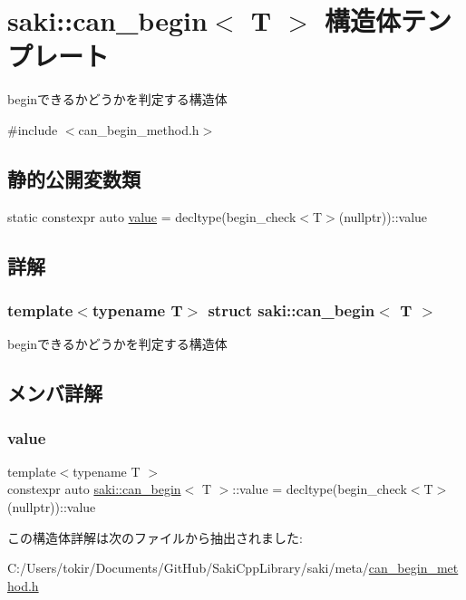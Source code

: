 \hypertarget{structsaki_1_1can__begin}{}\section{saki\+:\+:can\+\_\+begin$<$ T $>$ 構造体テンプレート}
\label{structsaki_1_1can__begin}


beginできるかどうかを判定する構造体  




{\ttfamily \#include $<$can\+\_\+begin\+\_\+method.\+h$>$}

\subsection*{静的公開変数類}
\begin{DoxyCompactItemize}
\item 
static constexpr auto \mbox{\hyperlink{structsaki_1_1can__begin_a6d16b8cbacbf7d9be197d09c517d503d}{value}} = decltype(begin\+\_\+check$<$T$>$(nullptr))\+::value
\end{DoxyCompactItemize}


\subsection{詳解}
\subsubsection*{template$<$typename T$>$\newline
struct saki\+::can\+\_\+begin$<$ T $>$}

beginできるかどうかを判定する構造体 

\subsection{メンバ詳解}
\mbox{\label{structsaki_1_1can__begin_a6d16b8cbacbf7d9be197d09c517d503d}} 
\subsubsection{\texorpdfstring{value}{value}}
{\footnotesize\ttfamily template$<$typename T $>$ \\
constexpr auto \mbox{\hyperlink{structsaki_1_1can__begin}{saki\+::can\+\_\+begin}}$<$ T $>$\+::value = decltype(begin\+\_\+check$<$T$>$(nullptr))\+::value\hspace{0.3cm}{\ttfamily [static]}}



この構造体詳解は次のファイルから抽出されました\+:\begin{DoxyCompactItemize}
\item 
C\+:/\+Users/tokir/\+Documents/\+Git\+Hub/\+Saki\+Cpp\+Library/saki/meta/\mbox{\hyperlink{can__begin__method_8h}{can\+\_\+begin\+\_\+method.\+h}}\end{DoxyCompactItemize}
